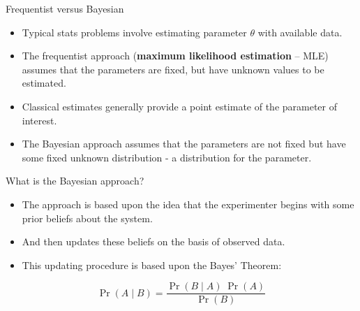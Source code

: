 \documentclass[
  ignorenonframetext,
  aspectratio=169]{beamer}
\providecommand{\tightlist}{%
  \setlength{\itemsep}{0pt}\setlength{\parskip}{0pt}}
\begin{document}
\begin{frame}{Frequentist versus Bayesian}
\protect\hypertarget{frequentist-versus-bayesian}{}
\begin{itemize}[<+->]
\tightlist
\item
  Typical stats problems involve estimating parameter \(\theta\) with
  available data.
\end{itemize}

\begin{itemize}[<+->]
\tightlist
\item
  The frequentist approach (\textbf{maximum likelihood estimation} --
  MLE) assumes that the parameters are fixed, but have unknown values to
  be estimated.
\end{itemize}

\begin{itemize}[<+->]
\tightlist
\item
  Classical estimates generally provide a point estimate of the
  parameter of interest.
\end{itemize}

\begin{itemize}[<+->]
\tightlist
\item
  The Bayesian approach assumes that the parameters are not fixed but
  have some fixed unknown distribution - a distribution for the
  parameter.
\end{itemize}
\end{frame}

\begin{frame}{What is the Bayesian approach?}
\protect\hypertarget{what-is-the-bayesian-approach}{}
\begin{itemize}
\tightlist
\item
  The approach is based upon the idea that the experimenter begins with
  some prior beliefs about the system.
\end{itemize}

\pause

\begin{itemize}
\tightlist
\item
  And then updates these beliefs on the basis of observed data.
\end{itemize}

\pause

\begin{itemize}
\tightlist
\item
  This updating procedure is based upon the Bayes' Theorem:
\end{itemize}

\[\Pr(A \mid B) = \frac{\Pr(B \mid A) \; \Pr(A)}{\Pr(B)}\]
\end{frame}
\end{document}
